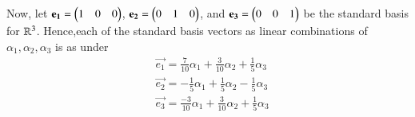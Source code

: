 \documentclass[journal,12pt,twocolumn]{IEEEtran}
\begin{document}
Now, let $\mathbf{e_1} = \begin{pmatrix}1 & 0 & 0 \end{pmatrix}$, $\mathbf{e_2} = \begin{pmatrix}0 & 1 & 0 \end{pmatrix}$, and $\mathbf{e_3} = \begin{pmatrix}0 & 0 & 1 \end{pmatrix}$ be the standard basis for $\mathbb{R}^3$. Hence,each of the standard basis vectors as linear combinations of $\alpha_1, \alpha_2, \alpha_3$ is as under
\begin{align}
& \vec{e_1} = \frac{7}{10}\alpha_1 +\frac{3}{10} \alpha_2+\frac{1}{5}\alpha_3\\ 
& \vec{e_2} = -\frac{1}{5}\alpha_1 +\frac{1}{5} \alpha_2 -\frac{1}{5} \alpha_3 \\
& \vec{e_3} = \frac{-3}{10}\alpha_1 + \frac{3}{10} \alpha_2+\frac{1}{5}\alpha_3 
\end{align}
\end{document}
